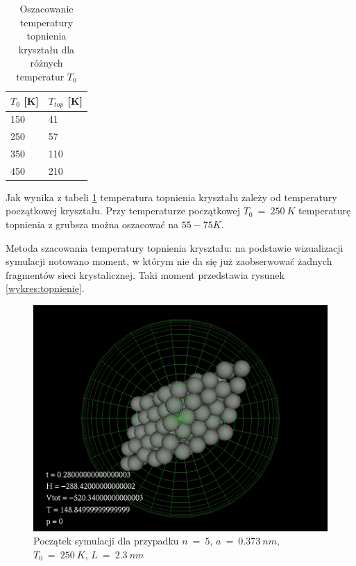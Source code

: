 \documentclass[10]{article}
\begin{document}
\begin{table}[H]
\centering
\begin{tabular}{|l|l|}
\hline
$T_0$ {[}K{]} & $T_{top}$ {[}K{]} \\ \hline
150           &  41        \\ \hline
250          & 57                     \\ \hline
350          &   110            \\ \hline
450          &  210             \\ \hline
\end{tabular}
\caption{Oszacowanie temperatury topnienia kryształu dla różnych temperatur $T_0$}
\label{tabela:oszacowanie T_top}
\end{table}

Jak wynika z tabeli \ref{tabela:oszacowanie T_top} temperatura topnienia kryształu zależy od temperatury początkowej kryształu. Przy temperaturze początkowej $T_0~=~250~K$ temperaturę topnienia z grubsza można oszacować na $55-75 K$.

Metoda szacowania temperatury topnienia kryształu: na podstawie wizualizacji symulacji notowano moment, w którym nie da się już zaobserwować żadnych fragmentów sieci krystalicznej. Taki moment przedstawia rysunek \ref{wykres:topnienie}.

\begin{figure}[H]
\begin{center}
\includegraphics[scale=0.4]{begin.png}
\caption{Początek symulacji dla przypadku $n~=~5$, $a~=~0.373~ nm$, $T_0 ~=~250~ K$, $L~=~2.3~nm$} \label{wykres:begin}
\end{center}
\end{figure}
\end{document}
